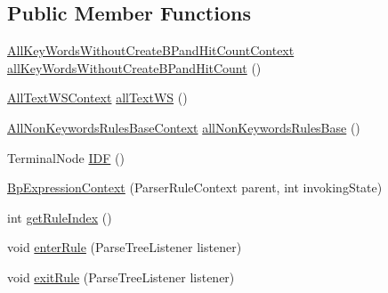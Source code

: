 \subsection*{Public Member Functions}
\begin{DoxyCompactItemize}
\item 
\hyperlink{classgov_1_1nasa_1_1jpf_1_1inspector_1_1client_1_1parser_1_1_console_grammar_parser_1_1_all_key_5423188b2439879f44801649cdee10f6}{All\+Key\+Words\+Without\+Create\+B\+Pand\+Hit\+Count\+Context} \hyperlink{classgov_1_1nasa_1_1jpf_1_1inspector_1_1client_1_1parser_1_1_console_grammar_parser_1_1_bp_expression_context_a4743b9f5d67f6a28f2e53dafa5b7cf26}{all\+Key\+Words\+Without\+Create\+B\+Pand\+Hit\+Count} ()
\item 
\hyperlink{classgov_1_1nasa_1_1jpf_1_1inspector_1_1client_1_1parser_1_1_console_grammar_parser_1_1_all_text_w_s_context}{All\+Text\+W\+S\+Context} \hyperlink{classgov_1_1nasa_1_1jpf_1_1inspector_1_1client_1_1parser_1_1_console_grammar_parser_1_1_bp_expression_context_a673fd836001f73fd33477a8e08c70eb1}{all\+Text\+WS} ()
\item 
\hyperlink{classgov_1_1nasa_1_1jpf_1_1inspector_1_1client_1_1parser_1_1_console_grammar_parser_1_1_all_non_keywords_rules_base_context}{All\+Non\+Keywords\+Rules\+Base\+Context} \hyperlink{classgov_1_1nasa_1_1jpf_1_1inspector_1_1client_1_1parser_1_1_console_grammar_parser_1_1_bp_expression_context_a7e920d6736c51ae666d885a0b8438630}{all\+Non\+Keywords\+Rules\+Base} ()
\item 
Terminal\+Node \hyperlink{classgov_1_1nasa_1_1jpf_1_1inspector_1_1client_1_1parser_1_1_console_grammar_parser_1_1_bp_expression_context_abfb8d2c969efae0c8db4d302ce9c940e}{I\+DF} ()
\item 
\hyperlink{classgov_1_1nasa_1_1jpf_1_1inspector_1_1client_1_1parser_1_1_console_grammar_parser_1_1_bp_expression_context_accaab0f67f828df6de505199398bc7bb}{Bp\+Expression\+Context} (Parser\+Rule\+Context parent, int invoking\+State)
\item 
int \hyperlink{classgov_1_1nasa_1_1jpf_1_1inspector_1_1client_1_1parser_1_1_console_grammar_parser_1_1_bp_expression_context_a97beda2b3b6e4065436e5e09635076b0}{get\+Rule\+Index} ()
\item 
void \hyperlink{classgov_1_1nasa_1_1jpf_1_1inspector_1_1client_1_1parser_1_1_console_grammar_parser_1_1_bp_expression_context_abf4093ecb1089b3380c83df90bd7938b}{enter\+Rule} (Parse\+Tree\+Listener listener)
\item 
void \hyperlink{classgov_1_1nasa_1_1jpf_1_1inspector_1_1client_1_1parser_1_1_console_grammar_parser_1_1_bp_expression_context_a3bd0fabac200c24f3a9ddebe9a346538}{exit\+Rule} (Parse\+Tree\+Listener listener)
\end{DoxyCompactItemize}
